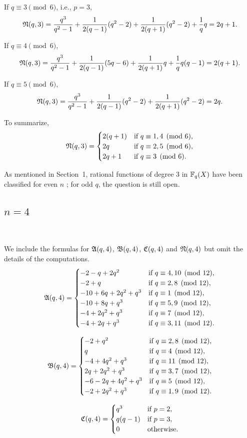 \documentclass{amsart}
\numberwithin{equation}{section}
\theoremstyle{definition}
\newcommand{\f}{\Bbb F}
\begin{document}
\medskip
If $q\equiv 3\pmod 6$, i.e., $p=3$,
\[
\frak N(q,3)=\frac{q^3}{q^2-1}+\frac 1{2(q-1)}(q^2-2)+\frac 1{2(q+1)}(q^2-2)+\frac 1qq=2q+1.
\]

\medskip
If $q\equiv 4\pmod 6$,
\[
\frak N(q,3)=\frac{q^3}{q^2-1}+\frac 1{2(q-1)}(5q-6)+\frac 1{2(q+1)}q+\frac 1qq(q-1)=2(q+1).
\]

\medskip
If $q\equiv 5\pmod 6$,
\[
\frak N(q,3)=\frac{q^3}{q^2-1}+\frac 1{2(q-1)}(q^2-2)+\frac 1{2(q+1)}(q^2-2)=2q.
\]

\medskip
To summarize,
\[
\frak N(q,3)=\begin{cases}
2(q+1)&\text{if}\ q\equiv 1,4\pmod 6,\cr
2q&\text{if}\ q\equiv 2,5\pmod 6,\cr
2q+1&\text{if}\ q\equiv 3\pmod 6.
\end{cases}
\]

As mentioned in Section~1, rational functions of degree $3$ in $\f_q(X)$ have been classified for even $n$ \cite{Mattarei-Pizzato-arXiv2104.00111}; for odd $q$, the question is still open.


\subsection{$n=4$}\

We include the formulas for $\frak A(q,4)$, $\frak B(q,4)$, $\frak C(q,4)$ and $\frak N(q,4)$ but omit the details of the computations.
\[
\frak A(q,4)=\begin{cases}
-2-q+2q^2&\text{if}\ q\equiv 4,10\pmod{12},\cr
-2+q&\text{if}\ q\equiv 2,8\pmod{12},\cr
-10+6q+2q^2+q^3&\text{if}\ q\equiv 1\pmod{12},\cr
-10+8q+q^3&\text{if}\ q\equiv 5,9\pmod{12},\cr
-4+2q^2+q^3&\text{if}\ q\equiv 7\pmod{12},\cr
-4+2q+q^3&\text{if}\ q\equiv 3,11\pmod{12}.
\end{cases}
\]

\[
\frak B(q,4)=\begin{cases}
-2+q^2&\text{if}\ q\equiv 2,8\pmod{12},\cr
q&\text{if}\ q\equiv 4\pmod{12},\cr
-4+4q^2+q^3&\text{if}\ q\equiv 11\pmod{12},\cr
2q+2q^2+q^3&\text{if}\ q\equiv 3,7\pmod{12},\cr
-6-2q+4q^2+q^3&\text{if}\ q\equiv 5\pmod{12},\cr
-2+2q^2+q^3&\text{if}\ q\equiv 1,9\pmod{12}.
\end{cases}
\]

\[
\frak C(q,4)=\begin{cases}
q^3&\text{if}\ p=2,\cr
q(q-1)&\text{if}\ p=3,\cr
0&\text{otherwise}.
\end{cases}
\]
\end{document}
